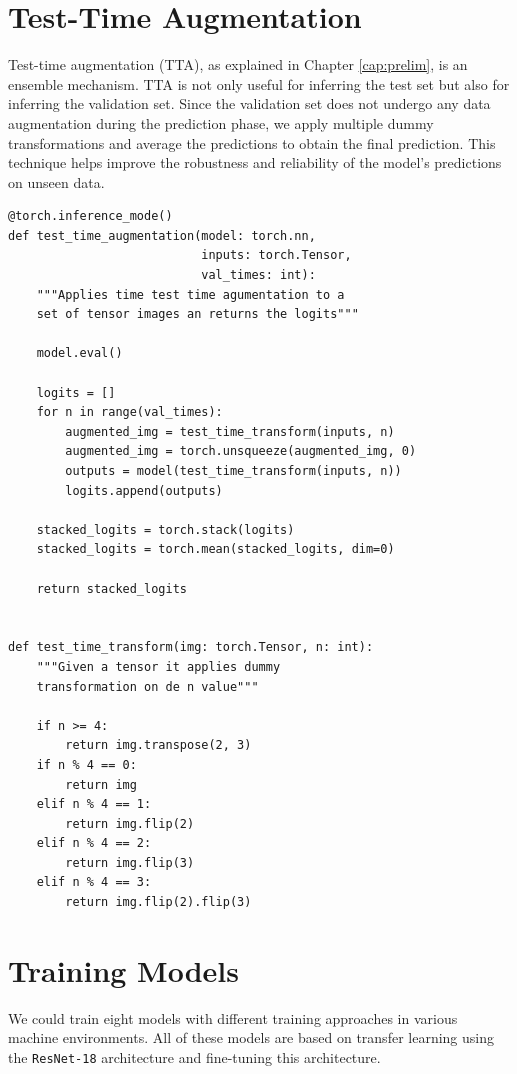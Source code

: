 \section{Test-Time Augmentation}

Test-time augmentation (TTA), as explained in Chapter \ref{cap:prelim}, is an ensemble mechanism. TTA is not only useful for inferring the test set but also for inferring the validation set. Since the validation set does not undergo any data augmentation during the prediction phase, we apply multiple dummy transformations and average the predictions to obtain the final prediction. This technique helps improve the robustness and reliability of the model's predictions on unseen data.

\begin{Verbatim}[fontsize=\small]
@torch.inference_mode()
def test_time_augmentation(model: torch.nn,
                           inputs: torch.Tensor,
                           val_times: int):
    """Applies time test time agumentation to a
    set of tensor images an returns the logits"""

    model.eval()

    logits = []
    for n in range(val_times):
        augmented_img = test_time_transform(inputs, n)
        augmented_img = torch.unsqueeze(augmented_img, 0)
        outputs = model(test_time_transform(inputs, n))
        logits.append(outputs)

    stacked_logits = torch.stack(logits)
    stacked_logits = torch.mean(stacked_logits, dim=0)

    return stacked_logits


def test_time_transform(img: torch.Tensor, n: int):
    """Given a tensor it applies dummy
    transformation on de n value"""

    if n >= 4:
        return img.transpose(2, 3)
    if n % 4 == 0:
        return img
    elif n % 4 == 1:
        return img.flip(2)
    elif n % 4 == 2:
        return img.flip(3)
    elif n % 4 == 3:
        return img.flip(2).flip(3)
\end{Verbatim}

\newpage

\section{Training Models} 

We could train eight models with different training approaches in various machine environments. All of these models are based on transfer learning using the \texttt{ResNet-18} architecture and fine-tuning this architecture. \\

